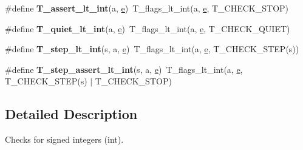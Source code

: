 \begin{DoxyCompactItemize}
\item 
\mbox{\label{group__RTEMSTestFrameworkChecksInt_ga42f8b1ef10d2e277f120b88b4a1c66f4}} 
\#define {\bfseries T\+\_\+assert\+\_\+lt\+\_\+int}(a,  \mbox{\hyperlink{sun4u_2tte_8h_a8b0b9ed08e0e18920ec2682f48228c27}{e}})~T\+\_\+flags\+\_\+lt\+\_\+int(a, \mbox{\hyperlink{sun4u_2tte_8h_a8b0b9ed08e0e18920ec2682f48228c27}{e}}, T\+\_\+\+C\+H\+E\+C\+K\+\_\+\+S\+T\+OP)
\item 
\mbox{\label{group__RTEMSTestFrameworkChecksInt_ga464af5243c75bf198c74a4a95fa7fded}} 
\#define {\bfseries T\+\_\+quiet\+\_\+lt\+\_\+int}(a,  \mbox{\hyperlink{sun4u_2tte_8h_a8b0b9ed08e0e18920ec2682f48228c27}{e}})~T\+\_\+flags\+\_\+lt\+\_\+int(a, \mbox{\hyperlink{sun4u_2tte_8h_a8b0b9ed08e0e18920ec2682f48228c27}{e}}, T\+\_\+\+C\+H\+E\+C\+K\+\_\+\+Q\+U\+I\+ET)
\item 
\mbox{\label{group__RTEMSTestFrameworkChecksInt_ga5c142fefc24c0e11a0d5522c485ebdb7}} 
\#define {\bfseries T\+\_\+step\+\_\+lt\+\_\+int}(s,  a,  \mbox{\hyperlink{sun4u_2tte_8h_a8b0b9ed08e0e18920ec2682f48228c27}{e}})~T\+\_\+flags\+\_\+lt\+\_\+int(a, \mbox{\hyperlink{sun4u_2tte_8h_a8b0b9ed08e0e18920ec2682f48228c27}{e}}, T\+\_\+\+C\+H\+E\+C\+K\+\_\+\+S\+T\+EP(s))
\item 
\mbox{\label{group__RTEMSTestFrameworkChecksInt_ga9d1024c607b07ee27655ae4f5fa457f4}} 
\#define {\bfseries T\+\_\+step\+\_\+assert\+\_\+lt\+\_\+int}(s,  a,  \mbox{\hyperlink{sun4u_2tte_8h_a8b0b9ed08e0e18920ec2682f48228c27}{e}})~T\+\_\+flags\+\_\+lt\+\_\+int(a, \mbox{\hyperlink{sun4u_2tte_8h_a8b0b9ed08e0e18920ec2682f48228c27}{e}}, T\+\_\+\+C\+H\+E\+C\+K\+\_\+\+S\+T\+EP(s) $\vert$ T\+\_\+\+C\+H\+E\+C\+K\+\_\+\+S\+T\+OP)
\end{DoxyCompactItemize}


\subsection{Detailed Description}
Checks for signed integers (int). 

